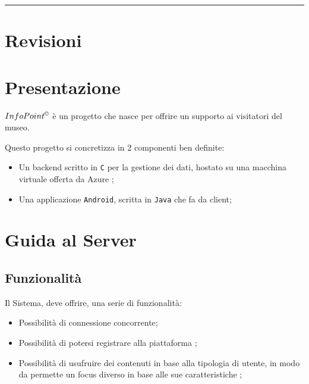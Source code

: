 \documentclass[letterpaper, 11pt]{article}
\begin{document}
\newpage
\restoregeometry
\renewcommand*\contentsname{\hfill Indice \hfill}
\tableofcontents
\pagebreak

\noindent\rule{\textwidth}{0.5pt}
\section{Revisioni}
\label{Revisioni}
\section{Presentazione}
\label{Presentazione}
\noindent{}

\(InfoPoint^{\copyright}\) è un progetto che nasce per offrire un supporto ai visitatori del museo.

Questo progetto si concretizza in 2 componenti ben definite:
\begin{itemize}
\item Un backend scritto in \texttt{C} per la gestione dei dati, hostato \autocite{HOSTING} su una macchina virtuale offerta da Azure \autocite{VirtualMachines};
\item Una applicazione \texttt{Android}, scritta in \texttt{Java} che fa da client;
\end{itemize}
\section{Guida al Server}
\label{Guida al Server}
\subsection{Funzionalità}
\label{Guida al Server - Funzionalità}
Il Sistema, deve offrire, una serie di funzionalità:
\begin{itemize}
\item Possibilità di connessione concorrente;
\item Possibilità di potersi registrare alla piattaforma \autocite{RefRegistrazione};
\item Possibilità di usufruire dei contenuti in base alla tipologia di utente, in modo da permette un focus diverso in base alle sue caratteristiche \autocite{RefUtenti};
\end{itemize}
\end{document}
